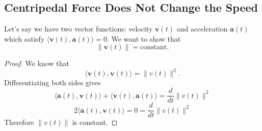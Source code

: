 \documentclass[12pt,a4paper]{report}
\begin{document}
  \subsection*{Centripedal Force Does Not Change the Speed}
  Let's say we have two vector functions: velocity \(\mathbf v(t)\) and acceleration \(\mathbf a(t)\) which satisfy \(\langle \mathbf v(t), \mathbf a(t)\rangle = 0\). We want to show that
  \[\|\mathbf v(t)\| = \text{constant}.\]
  
  \begin{proof}
    We know that
    \[\langle \mathbf v(t), \mathbf v(t)\rangle = \|v(t)\|^2.\]
    Differentiating both sides gives
    \[\langle \mathbf a(t), \mathbf v(t)\rangle + \langle \mathbf v(t), \mathbf a(t)\rangle = \frac{d}{dt}\|v(t)\|^2\]
    \[2\langle \mathbf a(t), \mathbf v(t)\rangle = 0 = \frac{d}{dt}\|v(t)\|^2\]
    Therefore \(\|v(t)\|\) is constant. 
  \end{proof}
\end{document}
